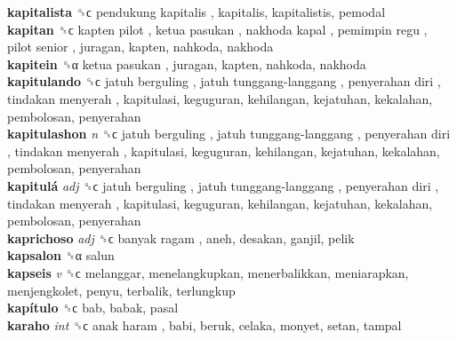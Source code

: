 \textbf{kapitalista} ␝ϲ   pendukung kapitalis , kapitalis, kapitalistis, pemodal  \\
\textbf{kapitan} ␝ϲ   kapten pilot ,  ketua pasukan ,  nakhoda kapal ,  pemimpin regu ,  pilot senior , juragan, kapten, nahkoda, nakhoda  \\
\textbf{kapitein} ␝α   ketua pasukan , juragan, kapten, nahkoda, nakhoda  \\
\textbf{kapitulando} ␝ϲ   jatuh berguling ,  jatuh tunggang-langgang ,  penyerahan diri ,  tindakan menyerah , kapitulasi, keguguran, kehilangan, kejatuhan, kekalahan, pembolosan, penyerahan  \\
\textbf{kapitulashon} \emph{n}  ␝ϲ   jatuh berguling ,  jatuh tunggang-langgang ,  penyerahan diri ,  tindakan menyerah , kapitulasi, keguguran, kehilangan, kejatuhan, kekalahan, pembolosan, penyerahan  \\
\textbf{kapitulá} \emph{adj}  ␝ϲ   jatuh berguling ,  jatuh tunggang-langgang ,  penyerahan diri ,  tindakan menyerah , kapitulasi, keguguran, kehilangan, kejatuhan, kekalahan, pembolosan, penyerahan  \\
\textbf{kaprichoso} \emph{adj}  ␝ϲ   banyak ragam , aneh, desakan, ganjil, pelik  \\
\textbf{kapsalon} ␝α  salun  \\
\textbf{kapseis} \emph{v}  ␝ϲ  melanggar, menelangkupkan, menerbalikkan, meniarapkan, menjengkolet, penyu, terbalik, terlungkup  \\
\textbf{kapítulo} ␝ϲ  bab, babak, pasal  \\
\textbf{karaho} \emph{int}  ␝ϲ   anak haram , babi, beruk, celaka, monyet, setan, tampal  \\
